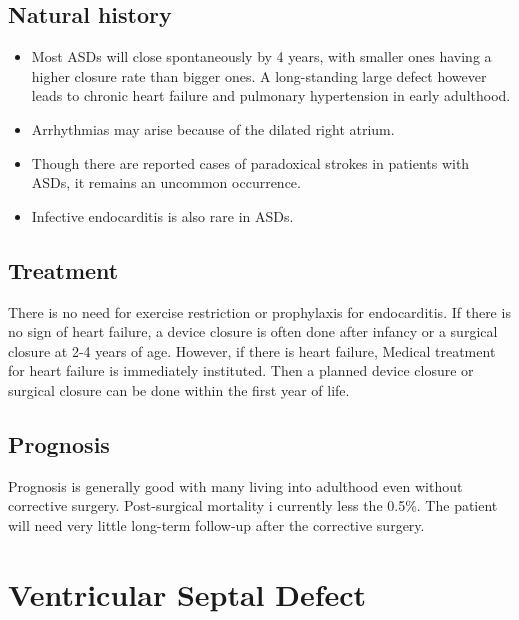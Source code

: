\documentclass[
  letterpaper,
  DIV=11,
  numbers=noendperiod]{scrreprt}
\providecommand{\tightlist}{%
  \setlength{\itemsep}{0pt}\setlength{\parskip}{0pt}}\usepackage{longtable,booktabs,array}
\begin{document}
\hypertarget{natural-history}{%
\section{Natural history}\label{natural-history}}

\begin{itemize}
\tightlist
\item
  Most ASDs will close spontaneously by 4 years, with smaller ones
  having a higher closure rate than bigger ones. A long-standing large
  defect however leads to chronic heart failure and pulmonary
  hypertension in early adulthood.
\item
  Arrhythmias may arise because of the dilated right atrium.
\item
  Though there are reported cases of paradoxical strokes in patients
  with ASDs, it remains an uncommon occurrence.
\item
  Infective endocarditis is also rare in ASDs.
\end{itemize}

\hypertarget{treatment}{%
\section{Treatment}\label{treatment}}

There is no need for exercise restriction or prophylaxis for
endocarditis. If there is no sign of heart failure, a device closure is
often done after infancy or a surgical closure at 2-4 years of age.
However, if there is heart failure, Medical treatment for heart failure
is immediately instituted. Then a planned device closure or surgical
closure can be done within the first year of life.

\hypertarget{prognosis}{%
\section{Prognosis}\label{prognosis}}

Prognosis is generally good with many living into adulthood even without
corrective surgery. Post-surgical mortality i currently less the 0.5\%.
The patient will need very little long-term follow-up after the
corrective surgery.

\hypertarget{ventricular-septal-defect}{%
\chapter{Ventricular Septal Defect}\label{ventricular-septal-defect}}
\end{document}
